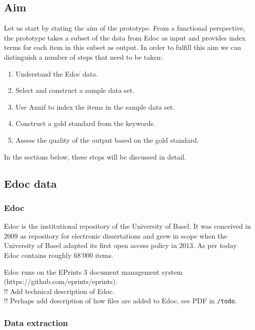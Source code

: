 \hypertarget{aim}{%
\subsection{Aim}\label{aim}}

Let us start by stating the aim of the prototype. From a functional
perspective, the prototype takes a subset of the data from Edoc as input
and provides index terms for each item in this subset as output. In
order to fulfill this aim we can distinguish a number of steps that need
to be taken:

\begin{enumerate}
\def\labelenumi{\arabic{enumi}.}
\tightlist
\item
  Understand the Edoc data.\\
\item
  Select and construct a sample data set.
\item
  Use Annif to index the items in the sample data set.
\item
  Construct a gold standard from the keywords.
\item
  Assess the quality of the output based on the gold standard.
\end{enumerate}

In the sections below, these steps will be discussed in detail.

\hypertarget{edoc-data}{%
\subsection{Edoc data}\label{edoc-data}}

\hypertarget{edoc}{%
\subsubsection{Edoc}\label{edoc}}

Edoc is the institutional repository of the University of Basel. It was
conceived in 2009 as repository for electronic dissertations and grew in
scope when the University of Basel adapted its first open access policy
in 2013. As per today Edoc contains roughly 68'000 items.

Edoc runs on the EPrints 3 document management system
(https://github.com/eprints/eprints).\\
!! Add technical description of Edoc.\\
!! Perhaps add description of how files are added to Edoc, see PDF in
\texttt{/todo}.

\hypertarget{data-extraction}{%
\subsubsection{Data extraction}\label{data-extraction}}

